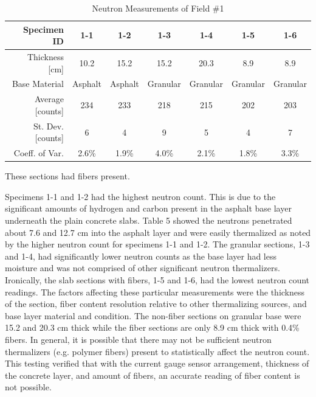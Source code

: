 \documentclass[9pt,twocolumn,twoside]{iscp}
\begin{document}
\begin{table}[t]%
\caption{Neutron Measurements of Field \#1}
\label{tab:field2}
\centering
\begin{tabular}{rcccccc}
Specimen ID & 1-1 & 1-2 & 1-3 & 1-4 & 1-5\footnotemark[1] & 1-6\footnotemark[1] \\
\midrule
Thickness {[}cm{]} & 10.2 & 15.2 & 15.2 & 20.3 & 8.9 & 8.9 \\
Base Material & Asphalt & Asphalt & Granular & Granular & Granular & Granular \\
Average {[}counts{]} & 234 & 233 & 218 & 215 & 202 & 203 \\
St. Dev. {[}counts{]} & 6 & 4 & 9 & 5 & 4 & 7 \\
Coeff. of Var. & 2.6\% & 1.9\% & 4.0\% & 2.1\% & 1.8\% & 3.3\%\\
\bottomrule
\end{tabular}
\footnotesize \footnotemark[1]These sections had fibers present.
\end{table}


Specimens 1-1 and 1-2 had the highest neutron count. This is due to the significant amounts of hydrogen and carbon present in the asphalt base layer underneath the plain concrete slabs. Table 5 showed the neutrons penetrated about 7.6 and 12.7 cm into the asphalt layer and were easily thermalized as noted by the higher neutron count for specimens 1-1 and 1-2. The granular sections, 1-3 and 1-4, had significantly lower neutron counts as the base layer had less moisture and was not comprised of other significant neutron thermalizers. Ironically, the slab sections with fibers, 1-5 and 1-6, had the lowest neutron count readings. The factors affecting these particular measurements were the thickness of the section, fiber content resolution relative to other thermalizing sources, and base layer material and condition. The non-fiber sections on granular base were 15.2 and 20.3 cm thick while the fiber sections are only 8.9 cm thick with 0.4\% fibers. In general, it is possible that there may not be sufficient neutron thermalizers (e.g. polymer fibers) present to statistically affect the neutron count. This testing verified that with the current gauge sensor arrangement, thickness of the concrete layer, and amount of fibers, an accurate reading of fiber content is not possible.
\end{document}
